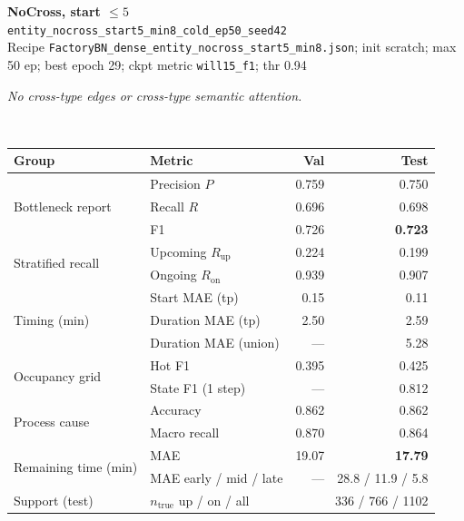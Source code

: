 \documentclass[9pt,a4paper,twocolumn]{extarticle}
\begin{document}
\noindent\begin{minipage}{\columnwidth}
\begin{center}
{\small\bfseries NoCross, start $\le 5$}\\
{\scriptsize\texttt{entity\_nocross\_start5\_min8\_cold\_ep50\_seed42}}\\
{\scriptsize Recipe \texttt{FactoryBN\_dense\_entity\_nocross\_start5\_min8.json}; init scratch; max 50 ep; best epoch 29; ckpt metric \texttt{will15\_f1}; thr 0.94}\\[1pt]
\parbox{0.96\columnwidth}{\scriptsize\itshape No cross-type edges or cross-type semantic attention.}\\[2pt]
\scriptsize\setlength{\tabcolsep}{3pt}
\begin{tabular}{llrr}
\toprule
Group & Metric & Val & Test \\
\midrule
\multirow{3}{*}{Bottleneck report}
  & Precision $P$ & 0.759 & 0.750 \\
  & Recall $R$ & 0.696 & 0.698 \\
  & F1 & 0.726 & \textbf{0.723} \\
\midrule
\multirow{2}{*}{Stratified recall}
  & Upcoming $R_{\mathrm{up}}$ & 0.224 & 0.199 \\
  & Ongoing $R_{\mathrm{on}}$ & 0.939 & 0.907 \\
\midrule
\multirow{3}{*}{Timing (min)}
  & Start MAE (tp) & 0.15 & 0.11 \\
  & Duration MAE (tp) & 2.50 & 2.59 \\
  & Duration MAE (union) & --- & 5.28 \\
\midrule
\multirow{2}{*}{Occupancy grid}
  & Hot F1 & 0.395 & 0.425 \\
  & State F1 (1 step) & --- & 0.812 \\
\midrule
\multirow{2}{*}{Process cause}
  & Accuracy & 0.862 & 0.862 \\
  & Macro recall & 0.870 & 0.864 \\
\midrule
\multirow{2}{*}{Remaining time (min)}
  & MAE & 19.07 & \textbf{17.79} \\
  & MAE early / mid / late & --- & 28.8 / 11.9 / 5.8 \\
\midrule
Support (test)
  & $n_{\mathrm{true}}$ up / on / all & \multicolumn{2}{r}{336 / 766 / 1102} \\
\bottomrule
\end{tabular}
\end{center}
\end{minipage}\par\vspace{6pt}
\end{document}
